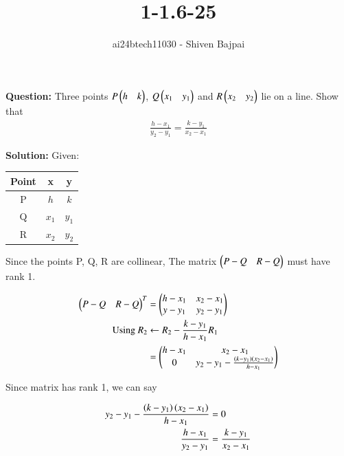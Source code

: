 \documentclass[journal]{IEEEtran}
\begin{document}
\onecolumn

\vspace{3cm}

\renewcommand{\thefigure}{\theenumi}
\renewcommand{\thetable}{\theenumi}

\title{1-1.6-25}
\author{ai24btech11030 - Shiven Bajpai}
\maketitle

\renewcommand{\thefigure}{\theenumi}
\renewcommand{\thetable}{\theenumi}

\textbf{Question: } Three points $P\begin{pmatrix}h & k\end{pmatrix}$, $Q\begin{pmatrix}x_1 & y_1\end{pmatrix}$ and $R\begin{pmatrix}x_2 & y_2\end{pmatrix}$ lie on a line. Show that \begin{align*}\frac{h-x_1}{y_2-y_1} = \frac{k - y_1}{x_2 - x_1}\end{align*}

\textbf{Solution: } Given:
\begin{center}
\begin{tabular}{| c | c | c |}
    \hline
    \textbf{Point} & \textbf{x} & \textbf{y}\\
    \hline
    P & $h$ & $k$\\
    \hline
    Q & $x_1$ & $y_1$\\
    \hline
    R & $x_2$ & $y_2$\\
    \hline
\end{tabular}
\end{center}
    
Since the points P, Q, R are collinear, The matrix $\begin{pmatrix}P-Q & R-Q\end{pmatrix}$ must have rank 1.

\begin{align*}
    \begin{pmatrix}P-Q & R-Q\end{pmatrix}^T &= \begin{pmatrix}h-x_1 & x_2 - x_1 \\ y-y_1 & y_2-y_1\end{pmatrix}\\
    \text{Using  } R_2 &\leftarrow R_2 - \frac{k-y_1}{h-x_1}R_1\\
    &= \begin{pmatrix}h-x_1 & x_2 - x_1 \\ 0 & y_2-y_1 -\frac{\left(k-y_1\right)\left({x_2 - x_1}\right)}{h-x_1}\end{pmatrix}
\end{align*}

Since matrix has rank 1, we can say

\begin{align*}
    y_2-y_1 -\frac{\left(k-y_1\right)\left({x_2 - x_1}\right)}{h-x_1} &= 0\\
    \frac{h-x_1}{y_2-y_1} &= \frac{k - y_1}{x_2 - x_1}
\end{align*}
\end{document}
